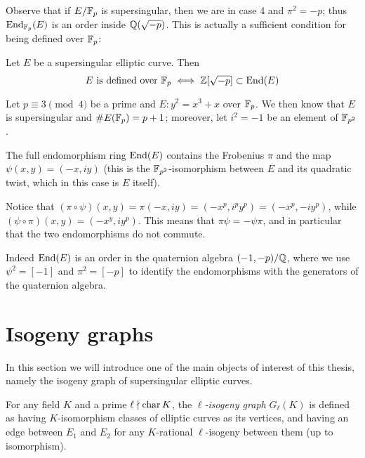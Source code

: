 Observe that if $E/\mathbb{F}_p$ is supersingular, then we are in case 4 and $\pi^2=-p$; thus $\operatorname{End}_{\mathbb{F}_p}(E)$ is an order inside $\mathbb{Q}(\sqrt{-p})$. This is actually a sufficient condition for being defined over $\mathbb{F}_p$:
\begin{proposition}
    Let $E$ be a supersingular elliptic curve. Then
    $$E \text{ is defined over } \mathbb{F}_p\iff \mathbb{Z}[\sqrt{-p}]\subset\operatorname{End}(E)$$
\end{proposition}



\begin{example}
    Let $p\equiv3\pmod4$ be a prime and $E:y^2=x^3+x$ over $\mathbb{F}_p$. We then know that $E$ is supersingular and $\# E(\mathbb{F}_p)=p+1$; moreover, let $i^2=-1$ be an element of $\mathbb{F}_{p^2}$.
    
    The full endomorphism ring $\operatorname{End}(E)$ contains the Frobenius $\pi$ and the map $\psi(x,y)=(-x,iy)$ (this is the $\mathbb{F}_{p^2}$-isomorphism between $E$ and its quadratic twist, which in this case is $E$ itself).
    
    Notice that $(\pi\circ\psi)(x,y)=\pi(-x,iy)=(-x^p,i^py^p)=(-x^p,-iy^p)$, while $(\psi\circ\pi)(x,y)=(-x^y,iy^p)$. This means that $\pi\psi=-\psi\pi$, and in particular that the two endomorphisms do not commute.
    
    Indeed $\operatorname{End}(E)$ is an order in the quaternion algebra $(-1,-p)/\mathbb{Q}$, where we use $\psi^2=[-1]$ and $\pi^2=[-p]$ to identify the endomorphisms with the generators of the quaternion algebra.
\end{example}

\section{Isogeny graphs}
In this section we will introduce one of the main objects of interest of this thesis, namely the isogeny graph of supersingular elliptic curves.

\begin{definition}
    For any field $K$ and a prime $\ell\nmid\operatorname{char} K$, the \emph{$\ell$-isogeny graph} $G_\ell(K)$ is defined as having $K$-isomorphism classes of elliptic curves as its vertices, and having an edge between $E_1$ and $E_2$ for any $K$-rational $\ell$-isogeny between them (up to isomorphism).
\end{definition}

